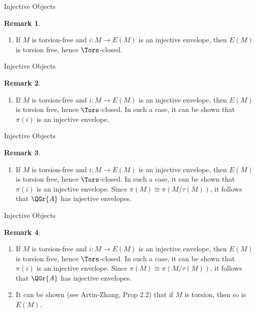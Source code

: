 \documentclass{beamer}
\theoremstyle{definition}
\newtheorem{rmk}{Remark}
\begin{document}
\begin{frame}{Injective Objects}
  \begin{rmk}
    \begin{enumerate}
    \item
      If $M$ is torsion-free and $i \colon M \rightarrow E(M)$ is an injective envelope, then $E(M)$ is torsion free, hence $\Tors$-closed.
    \end{enumerate}
  \end{rmk}
\end{frame}

\begin{frame}{Injective Objects}
  \setcounter{rmk}{1}
  \begin{rmk}
    \begin{enumerate}
    \item
      If $M$ is torsion-free and $i \colon M \rightarrow E(M)$ is an injective envelope, then $E(M)$ is torsion free, hence $\Tors$-closed.
      In such a case, it can be shown that $\pi(i)$ is an injective envelope.
    \end{enumerate}
  \end{rmk}
\end{frame}

\begin{frame}{Injective Objects}
  \setcounter{rmk}{1}
  \begin{rmk}
    \begin{enumerate}
    \item
      If $M$ is torsion-free and $i \colon M \rightarrow E(M)$ is an injective envelope, then $E(M)$ is torsion free, hence $\Tors$-closed.
      In such a case, it can be shown that $\pi(i)$ is an injective envelope.
      Since $\pi(M) \cong \pi(M/\tau(M))$, it follows that $\QGr{A}$ has injective envelopes.
    \end{enumerate}
  \end{rmk}
\end{frame}

\begin{frame}{Injective Objects}
  \setcounter{rmk}{1}
  \begin{rmk}
    \begin{enumerate}
    \item
      If $M$ is torsion-free and $i \colon M \rightarrow E(M)$ is an injective envelope, then $E(M)$ is torsion free, hence $\Tors$-closed.
      In such a case, it can be shown that $\pi(i)$ is an injective envelope.
      Since $\pi(M) \cong \pi(M/\tau(M))$, it follows that $\QGr{A}$ has injective envelopes.
    \item
      It can be shown (see Artin-Zhang, Prop 2.2) that if $M$ is torsion, then so is $E(M)$.
    \end{enumerate}
  \end{rmk}
\end{frame}
\end{document}
